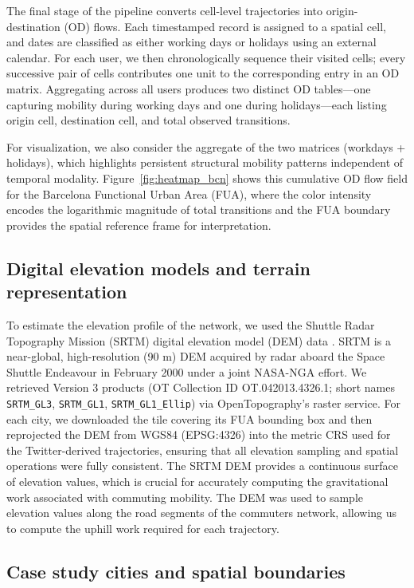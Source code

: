 \documentclass[twocolumn,amsmath,amssymb,floatfix,nature,shownopacs,footinbib,superscriptaddress]{revtex4-1} %
\begin{document}
The final stage of the pipeline converts cell-level trajectories into origin-destination (OD) flows. Each timestamped record is assigned to a spatial cell, and dates are classified as either working days or holidays using an external calendar. For each user, we then chronologically sequence their visited cells; every successive pair of cells contributes one unit to the corresponding entry in an OD matrix. Aggregating across all users produces two distinct OD tables—one capturing mobility during working days and one during holidays—each listing origin cell, destination cell, and total observed transitions.

For visualization, we also consider the aggregate of the two matrices (workdays + holidays), which highlights persistent structural mobility patterns independent of temporal modality. Figure~\ref{fig:heatmap_bcn} shows this cumulative OD flow field for the Barcelona Functional Urban Area (FUA), where the color intensity encodes the logarithmic magnitude of total transitions and the FUA boundary provides the spatial reference frame for interpretation.

\subsection*{Digital elevation models and terrain representation}
\label{sec:elevation-data}

To estimate the elevation profile of the network, we used the Shuttle Radar Topography Mission (SRTM) digital elevation model (DEM) data \cite{SRTM-OpenTopography}.  SRTM is a near-global, high-resolution (90 m) DEM acquired by radar aboard the Space Shuttle Endeavour in February 2000 under a joint NASA-NGA effort.  We retrieved Version 3 products (OT Collection ID OT.042013.4326.1; short names \texttt{SRTM\_GL3}, \texttt{SRTM\_GL1}, \texttt{SRTM\_GL1\_Ellip}) via OpenTopography's raster service.  For each city, we downloaded the tile covering its FUA bounding box and then reprojected the DEM from WGS84 (EPSG:4326) into the metric CRS used for the Twitter-derived trajectories, ensuring that all elevation sampling and spatial operations were fully consistent.
The SRTM DEM provides a continuous surface of elevation values, which is crucial for accurately computing the gravitational work associated with commuting mobility. The DEM was used to sample elevation values along the road segments of the commuters network, allowing us to compute the uphill work required for each trajectory.

\subsection*{Case study cities and spatial boundaries}
\label{sec:city-boundaries}
\end{document}

